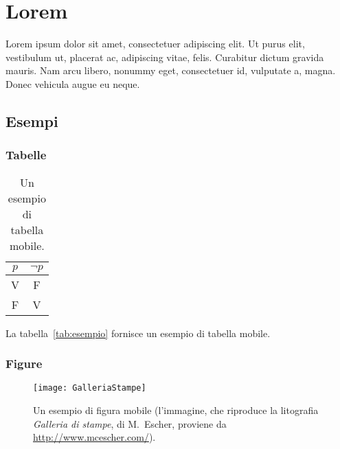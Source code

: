 
\section{Lorem}
\label{sec:lorem}
\cite{RefWorks:131}
Lorem ipsum dolor sit amet, consectetuer adipiscing elit. Ut purus elit, vestibulum ut, placerat ac, adipiscing vitae, felis. Curabitur dictum gravida mauris. Nam arcu libero, nonummy eget, consectetuer id, vulputate a, magna. Donec vehicula augue eu neque.

\subsection{Esempi}

\subsubsection{Tabelle}

\lipsum

\begin{table}[tb]
\caption[Un esempio di tabella mobile]{Un esempio di tabella mobile.}
\label{tab:esempio}
\centering
\begin{tabular}{cc}
\toprule
$p$ & $\lnot p$ \\ 
\midrule
V   & F \\ 
F   & V \\
\bottomrule 
\end{tabular}
\end{table}

La tabella~\vref{tab:esempio} fornisce un esempio di tabella mobile.

\lipsum[1-2]


\subsubsection{Figure}

\lipsum[2]

\begin{figure}[tb] 
\centering 
\texttt{[image: GalleriaStampe]} 
\caption[Un esempio di figura mobile]{Un esempio di figura mobile (l'immagine, che riproduce la litografia \emph{Galleria di stampe}, di M.~Escher, proviene da \url{http://www.mcescher.com/}).}
\label{fig:galleria} 
\end{figure}

